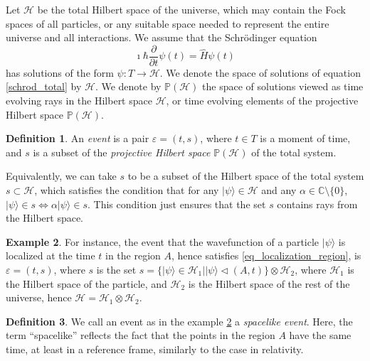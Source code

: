 \documentclass[11pt]{amsart}
\theoremstyle{definition}
\newtheorem{definition}{Definition}[section]
\newtheorem{example}[definition]{Example}
\theoremstyle{plain}
\begin{document}
Let $\mathcal{H}$ be the total Hilbert space of the universe, which may contain the Fock spaces of all particles, or any suitable space needed to represent the entire universe and all interactions.
We assume that the Schr\"odinger equation
\begin{equation}
\label{schrod_total}
\imath\hbar\frac{\partial}{\partial t}\psi(t)=\hat H \psi(t)
\end{equation}
has solutions of the form $\psi:T\to\mathcal{H}$. We denote the space of solutions of equation \eqref{schrod_total} by
$\mathscr{H}$. 
We denote by $\mathbb P(\mathscr{H})$ the space of solutions viewed as time evolving rays in the Hilbert space $\mathcal{H}$, or time evolving elements of the projective Hilbert space $\mathbb P(\mathcal{H})$.

\begin{definition}
\label{def:event_temporal}
An \emph{event} is a pair $\varepsilon=(t,s)$, where $t\in T$ is a moment of time, and $s$ is a subset of the \emph{projective Hilbert space} $\mathbb P(\mathcal{H})$ of the total system.
\end{definition}

Equivalently, we can take $s$ to be a subset of the Hilbert space of the total system $s\subset\mathcal{H}$, which satisfies the condition that for any $|{\psi}\rangle\in\mathcal{H}$ and any $\alpha\in\mathbb{C}\setminus\{0\}$, $|{\psi}\rangle\in s\Leftrightarrow\alpha|{\psi}\rangle\in s$. This condition just ensures that the set $s$ contains rays from the Hilbert space. 

\begin{example}
\label{ex:event_localized}
For instance, the event that the wavefunction of a particle $|{\psi}\rangle$ is localized at the time $t$ in the region $A$, hence satisfies \eqref{eq_localization_region}, is $\varepsilon=(t,s)$, where $s$ is the set $s=\{|{\psi}\rangle\in\mathcal{H}_1||{\psi}\rangle\triangleleft(A,t)\}\otimes\mathcal{H}_2$, where $\mathcal{H}_1$ is the Hilbert space of the particle, and $\mathcal{H}_2$ is the Hilbert space of the rest of the universe, hence $\mathcal{H}=\mathcal{H}_1\otimes\mathcal{H}_2$.
\end{example}

\begin{definition}
We call an event as in the example \ref{ex:event_localized} a \emph{spacelike event}. Here, the term ``spacelike'' reflects the fact that the points in the region $A$ have the same time, at least in a reference frame, similarly to the case in relativity.
\end{definition}
\end{document}
